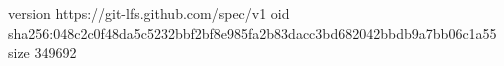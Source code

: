version https://git-lfs.github.com/spec/v1
oid sha256:048c2c0f48da5c5232bbf2bf8e985fa2b83dacc3bd682042bbdb9a7bb06c1a55
size 349692
